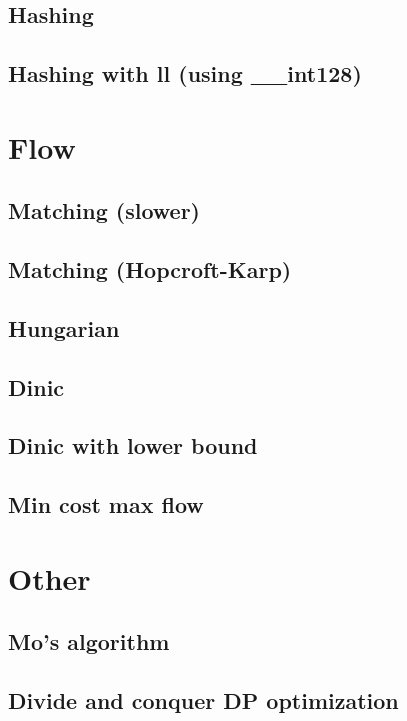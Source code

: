 \subsection{Hashing}
\subsection{Hashing with ll (using \_\_int128)}

\section{Flow}
\subsection{Matching (slower)}
\subsection{Matching (Hopcroft-Karp)}
\subsection{Hungarian}
\subsection{Dinic}
\subsection{Dinic with lower bound}
\subsection{Min cost max flow}

\section{Other}
\subsection{Mo's algorithm}
\subsection{Divide and conquer DP optimization}
